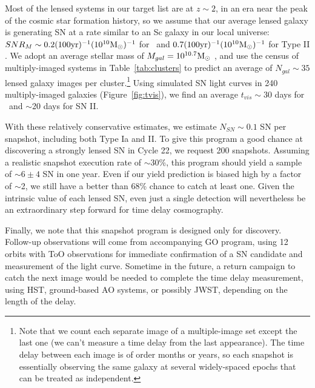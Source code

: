 Most of the lensed systems in our target list are at $z\sim 2$, in an
era near the peak of the cosmic star formation history, so we assume
that our average lensed galaxy is generating SN at a rate similar to
an Sc galaxy in our local universe: $SNR_{M} \sim0.2
(100 \mbox{yr})^{-1} (10^{10} \mbox{M$_{\odot}$})^{-1}$ for \SNIa\ and $0.7
(100 \mbox{yr})^{-1} (10^{10} \mbox{M$_{\odot}$})^{-1}$ for Type
II \citep{Mannucci:2005}.  We adopt an average stellar mass of
$M_{gal}=10^{10.7} \mbox{M$_{\odot}$}$ \citep{Tomczak:2013}, and use the census of
multiply-imaged systems in Table~\ref{tab:clusters} to predict an
average of $N_{gal}\sim 35$ lensed galaxy images per
cluster.\footnote{Note that we count each separate image of a
multiple-image set except the last one (we can't measure a time delay
from the last appearance). The time delay between each image is of
order months or years, so each snapshot is essentially observing the
same galaxy at several widely-spaced epochs that can be treated as
independent.}  Using simulated SN light curves in 240 multiply-imaged
galaxies (Figure~\ref{fig:tvis}), we find an average $t_{vis}\sim 30$
days for \SNIa\ and $\sim$20 days for SN II.


With these relatively conservative estimates, we estimate $N_{SN}\sim
0.1$ SN per snapshot, including both Type Ia and II.  To give this
program a good chance at discovering a strongly lensed SN in Cycle 22,
we request 200 snapshots.  Assuming a realistic snapshot execution
rate of $\sim$30\%, this program should yield a sample of $\sim 6 \pm
4$ SN in one year.  Even if our yield prediction is biased high by a
factor of $\sim$2, we still have a better than 68\% chance to catch at
least one.  Given the intrinsic value of each lensed SN, even just a
single detection will nevertheless be an extraordinary step forward
for time delay cosmography.

Finally, we note that this snapshot program is designed only for
discovery. Follow-up observations will come from accompanying GO
program, using 12 orbits with ToO observations for immediate
confirmation of a SN candidate and measurement of the light curve.
Sometime in the future, a return campaign to catch the next image
would be needed to complete the time delay measurement, using HST,
ground-based AO systems, or possibly JWST, depending on the length of
the delay.











